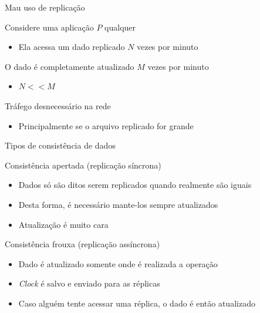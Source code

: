 \documentclass[compress]{beamer}
\begin{document}

\begin{frame}{Mau uso de replicação}

Considere uma aplicação $P$ qualquer
\begin{itemize}
    \item Ela acessa um dado replicado $N$ vezes por minuto
\end{itemize}

\vspace{1cm}

O dado é completamente atualizado $M$ vezes por minuto
\begin{itemize}
    \item $N <\!\!< M$
\end{itemize}

\vspace{1cm}

Tráfego desnecessário na rede
\begin{itemize}
    \item Principalmente se o arquivo replicado for grande
\end{itemize}
\end{frame}


\begin{frame}{Tipos de consistência de dados}

Consistência apertada (replicação síncrona)
\begin{itemize}
    \item Dados só são ditos serem replicados quando realmente são iguais
    \item Desta forma, é necessário mante-los sempre atualizados
    \item Atualização é muito cara
\end{itemize}

\vspace{0.5cm}

Consistência frouxa (replicação assíncrona)
\begin{itemize}
    \item Dado é atualizado somente onde é realizada a operação
    \item \textit{Clock} é salvo e enviado para as réplicas
    \item Caso alguém tente acessar uma réplica, o dado é então atualizado
\end{itemize}

\end{frame}
\end{document}
